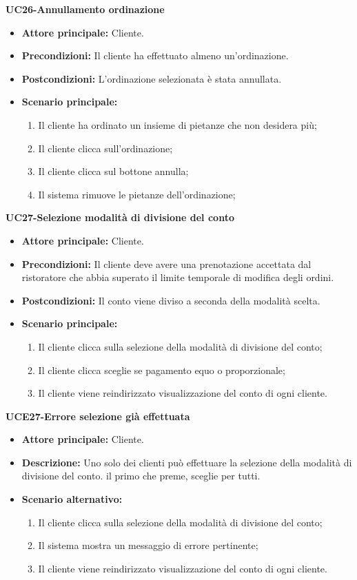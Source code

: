
\textbf{UC26-Annullamento ordinazione}
\begin{itemize}
\item \textbf{Attore principale:} Cliente.
\item \textbf{Precondizioni:} Il cliente ha effettuato almeno un'ordinazione.
\item \textbf{Postcondizioni:} L'ordinazione selezionata è stata annullata.
\item \textbf{Scenario principale:}
\begin{enumerate}
    \item Il cliente ha ordinato un insieme di pietanze che non desidera più;
    \item Il cliente clicca sull'ordinazione;
    \item Il cliente clicca sul bottone annulla;
    \item Il sistema rimuove le pietanze dell'ordinazione;
\end{enumerate}
\end{itemize}

\textbf{UC27-Selezione modalità di divisione del conto}
\begin{itemize}
\item \textbf{Attore principale:} Cliente.
\item \textbf{Precondizioni:} Il cliente deve avere una prenotazione accettata dal ristoratore che abbia superato il
  limite temporale di modifica degli ordini.
\item \textbf{Postcondizioni:} Il conto viene diviso a seconda della modalità scelta.
\item \textbf{Scenario principale:}
\begin{enumerate}
    \item Il cliente clicca sulla selezione della modalità di divisione del conto;
    \item Il cliente clicca sceglie se pagamento equo o proporzionale;
    \item Il cliente viene reindirizzato visualizzazione del conto di ogni cliente.
\end{enumerate}
\end{itemize}

\textbf{UCE27-Errore selezione già effettuata}
\begin{itemize}
\item \textbf{Attore principale:} Cliente.
\item \textbf{Descrizione:} Uno solo dei clienti può effettuare la selezione della modalità di divisione del conto.
  il primo che preme, sceglie per tutti.
\item \textbf{Scenario alternativo:}
\begin{enumerate}
    \item Il cliente clicca sulla selezione della modalità di divisione del conto;
    \item Il sistema mostra un messaggio di errore pertinente;
    \item Il cliente viene reindirizzato visualizzazione del conto di ogni cliente.
\end{enumerate}
\end{itemize}

